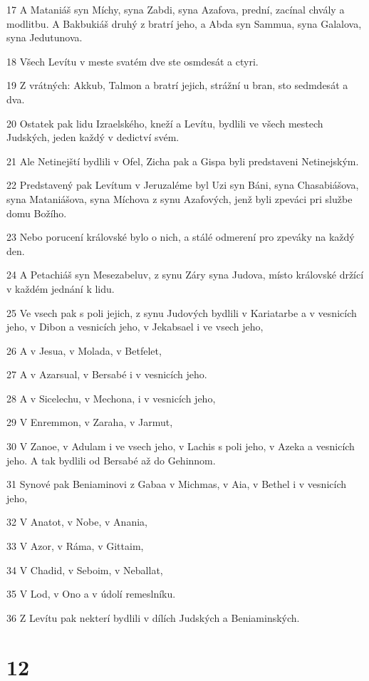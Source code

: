 \par 17 A Mataniáš syn Míchy, syna Zabdi, syna Azafova, prední, zacínal chvály a modlitbu. A Bakbukiáš druhý z bratrí jeho, a Abda syn Sammua, syna Galalova, syna Jedutunova.
\par 18 Všech Levítu v meste svatém dve ste osmdesát a ctyri.
\par 19 Z vrátných: Akkub, Talmon a bratrí jejich, strážní u bran, sto sedmdesát a dva.
\par 20 Ostatek pak lidu Izraelského, kneží a Levítu, bydlili ve všech mestech Judských, jeden každý v dedictví svém.
\par 21 Ale Netinejští bydlili v Ofel, Zicha pak a Gispa byli predstaveni Netinejským.
\par 22 Predstavený pak Levítum v Jeruzaléme byl Uzi syn Báni, syna Chasabiášova, syna Mataniášova, syna Míchova z synu Azafových, jenž byli zpeváci pri službe domu Božího.
\par 23 Nebo porucení královské bylo o nich, a stálé odmerení pro zpeváky na každý den.
\par 24 A Petachiáš syn Mesezabeluv, z synu Záry syna Judova, místo královské držící v každém jednání k lidu.
\par 25 Ve vsech pak s poli jejich, z synu Judových bydlili v Kariatarbe a v vesnicích jeho, v Dibon a vesnicích jeho, v Jekabsael i ve vsech jeho,
\par 26 A v Jesua, v Molada, v Betfelet,
\par 27 A v Azarsual, v Bersabé i v vesnicích jeho.
\par 28 A v Sicelechu, v Mechona, i v vesnicích jeho,
\par 29 V Enremmon, v Zaraha, v Jarmut,
\par 30 V Zanoe, v Adulam i ve vsech jeho, v Lachis s poli jeho, v Azeka a vesnicích jeho. A tak bydlili od Bersabé až do Gehinnom.
\par 31 Synové pak Beniaminovi z Gabaa v Michmas, v Aia, v Bethel i v vesnicích jeho,
\par 32 V Anatot, v Nobe, v Anania,
\par 33 V Azor, v Ráma, v Gittaim,
\par 34 V Chadid, v Seboim, v Neballat,
\par 35 V Lod, v Ono a v údolí remeslníku.
\par 36 Z Levítu pak nekterí bydlili v dílích Judských a Beniaminských.

\chapter{12}

